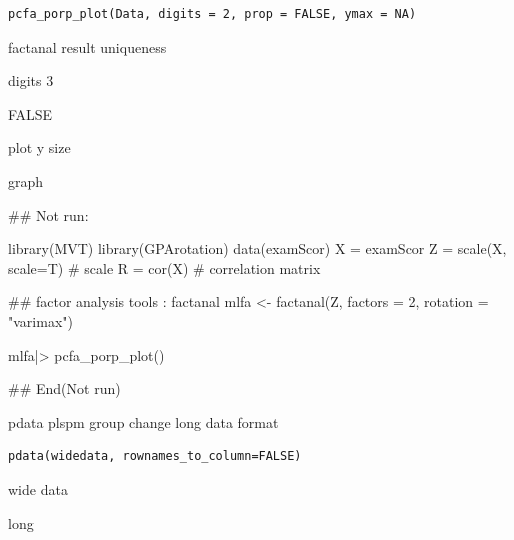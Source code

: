 \documentclass[a4paper]{book}
\begin{document}
%
\begin{Usage}
\begin{verbatim}
pcfa_porp_plot(Data, digits = 2, prop = FALSE, ymax = NA)
\end{verbatim}
\end{Usage}
%
\begin{Arguments}
\begin{ldescription}
\item[\code{Data}] factanal result uniqueness

\item[\code{digits}] digits 3

\item[\code{prop}] FALSE

\item[\code{ymax}] plot y size
\end{ldescription}
\end{Arguments}
%
\begin{Value}
graph
\end{Value}
%
\begin{Examples}
\begin{ExampleCode}
\#\# Not run: 

library(MVT)
library(GPArotation)
data(examScor)
X = examScor
Z = scale(X, scale=T)  # scale
R = cor(X)  # correlation matrix

## factor analysis tools : factanal
mlfa <- factanal(Z, factors = 2, rotation = "varimax")

mlfa|> pcfa_porp_plot()


## End(Not run)
\end{ExampleCode}
\end{Examples}
%
\begin{Description}
pdata plspm group change long data format
\end{Description}
%
\begin{Usage}
\begin{verbatim}
pdata(widedata, rownames_to_column=FALSE)
\end{verbatim}
\end{Usage}
%
\begin{Arguments}
\begin{ldescription}
\item[\code{data}] wide data
\end{ldescription}
\end{Arguments}
%
\begin{Value}
long
\end{Value}
\end{document}
